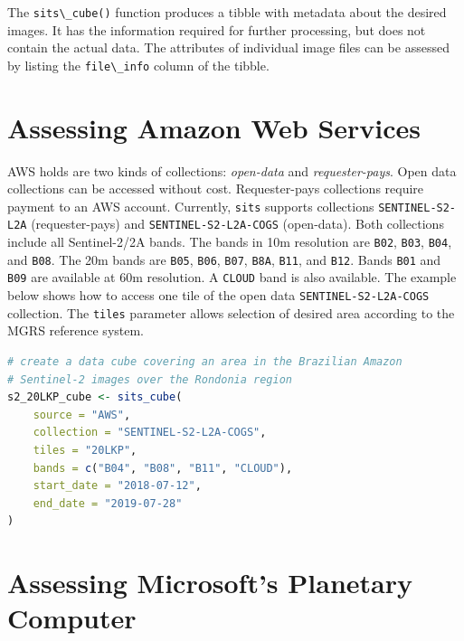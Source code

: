 \documentclass[
  11pt,
]{report}
\newcommand{\passthrough}[1]{#1}
\begin{document}
The \passthrough{\lstinline!sits\_cube()!} function produces a tibble
with metadata about the desired images. It has the information required
for further processing, but does not contain the actual data. The
attributes of individual image files can be assessed by listing the
\passthrough{\lstinline!file\_info!} column of the tibble.

\hypertarget{assessing-amazon-web-services}{%
\section*{Assessing Amazon Web
Services}\label{assessing-amazon-web-services}}

AWS holds are two kinds of collections: \emph{open-data} and
\emph{requester-pays}. Open data collections can be accessed without
cost. Requester-pays collections require payment to an AWS account.
Currently, \passthrough{\lstinline!sits!} supports collections
\passthrough{\lstinline!SENTINEL-S2-L2A!} (requester-pays) and
\passthrough{\lstinline!SENTINEL-S2-L2A-COGS!} (open-data). Both
collections include all Sentinel-2/2A bands. The bands in 10m resolution
are \passthrough{\lstinline!B02!}, \passthrough{\lstinline!B03!},
\passthrough{\lstinline!B04!}, and \passthrough{\lstinline!B08!}. The
20m bands are \passthrough{\lstinline!B05!},
\passthrough{\lstinline!B06!}, \passthrough{\lstinline!B07!},
\passthrough{\lstinline!B8A!}, \passthrough{\lstinline!B11!}, and
\passthrough{\lstinline!B12!}. Bands \passthrough{\lstinline!B01!} and
\passthrough{\lstinline!B09!} are available at 60m resolution. A
\passthrough{\lstinline!CLOUD!} band is also available. The example
below shows how to access one tile of the open data
\passthrough{\lstinline!SENTINEL-S2-L2A-COGS!} collection. The
\passthrough{\lstinline!tiles!} parameter allows selection of desired
area according to the MGRS reference system.

\begin{lstlisting}[language=R]
# create a data cube covering an area in the Brazilian Amazon
# Sentinel-2 images over the Rondonia region
s2_20LKP_cube <- sits_cube(
    source = "AWS",
    collection = "SENTINEL-S2-L2A-COGS",
    tiles = "20LKP",
    bands = c("B04", "B08", "B11", "CLOUD"),
    start_date = "2018-07-12",
    end_date = "2019-07-28"
)
\end{lstlisting}

\hypertarget{assessing-microsofts-planetary-computer}{%
\section*{Assessing Microsoft's Planetary
Computer}\label{assessing-microsofts-planetary-computer}}
\end{document}
